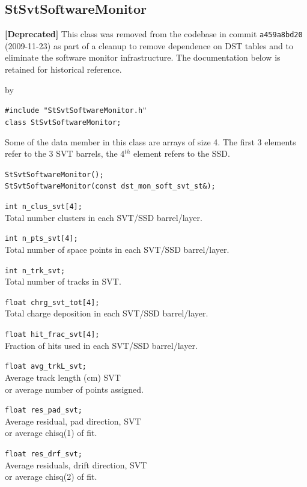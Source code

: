 \documentclass[twoside]{article}
\newcommand{\entrylabel}[1]{\mbox{\textbf{{#1}}}\hfil}%
\newenvironment{entry}
{\begin{list}{}%
    {\renewcommand{\makelabel}{\entrylabel}%
     \setlength{\labelwidth}{90pt}%
     \setlength{\leftmargin}{\labelwidth}
     \advance\leftmargin by \labelsep%
      }%
    }%
  {\end{list}}
\newcommand{\Entrylabel}[1]%
{\raisebox{0pt}[1ex][0pt]{\makebox[\labelwidth][l]%
    {\parbox[t]{\labelwidth}{\hspace{0pt}\textbf{{#1}}}}}}
\newenvironment{Entry}%
{\renewcommand{\entrylabel}{\Entrylabel}\begin{entry}}%
  {\end{entry}}
\begin{document}
\subsection{StSvtSoftwareMonitor}
\label{sec:StSvtSoftwareMonitor}
\textbf{[Deprecated]} This class was removed from the codebase in commit
\texttt{a459a8bd20} (2009-11-23) as part of a cleanup to remove dependence on
DST tables and to eliminate the software monitor infrastructure.
The documentation below is retained for historical reference.

\begin{Entry}
\item[Summary]
\item[Synopsis]
    \verb+#include "StSvtSoftwareMonitor.h"+\\
    \verb+class StSvtSoftwareMonitor;+\\
\item[Description]
    Some of the data member in this class are arrays of size 4.
    The first 3 elements refer to the 3 SVT barrels, the 4$^{th}$ element
    refers to the SSD.
\item[Related Classes]
\item[Public\\ Constructors]
    \verb+StSvtSoftwareMonitor();+\\
    \verb+StSvtSoftwareMonitor(const dst_mon_soft_svt_st&);+\\
\item[Public Data\\ Member]
    \verb+int n_clus_svt[4];+\\
    Total number clusters in each SVT/SSD barrel/layer. 
    
    \verb+int n_pts_svt[4];+\\
    Total number of space points in each SVT/SSD barrel/layer. 
    
    \verb+int n_trk_svt;+\\
    Total number of tracks in SVT.
    
    \verb+float chrg_svt_tot[4];+\\
    Total charge deposition in each SVT/SSD barrel/layer. 
    
    \verb+float hit_frac_svt[4];+\\
    Fraction of hits used in each SVT/SSD barrel/layer. 
    
    \verb+float avg_trkL_svt;+\\
    Average track length (cm) SVT \\
    or average number of points assigned.
    
    \verb+float res_pad_svt;+\\
    Average residual, pad direction, SVT \\
    or average chisq(1) of fit.

    \verb+float res_drf_svt;+\\
    Average residuals, drift direction, SVT \\
    or average chisq(2) of fit.
\end{Entry}
\clearpage
\end{document}

